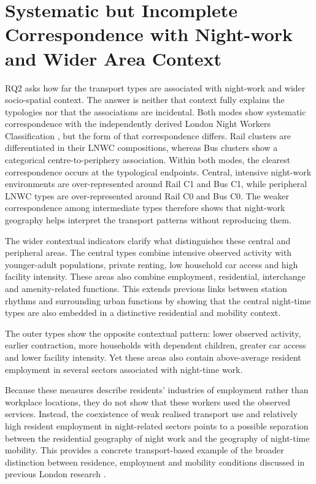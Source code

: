 \section{Systematic but Incomplete Correspondence with Night-work and Wider Area Context}

RQ2 asks how far the transport types are associated with night-work and wider socio-spatial context. The answer is neither that context fully explains the typologies nor that the associations are incidental. Both modes show systematic correspondence with the independently derived London Night Workers Classification \citep{Mavrogeni2025}, but the form of that correspondence differs. Rail clusters are differentiated in their LNWC compositions, whereas Bus clusters show a categorical centre-to-periphery association. Within both modes, the clearest correspondence occurs at the typological endpoints. Central, intensive night-work environments are over-represented around Rail C1 and Bus C1, while peripheral LNWC types are over-represented around Rail C0 and Bus C0. The weaker correspondence among intermediate types therefore shows that night-work geography helps interpret the transport patterns without reproducing them.

The wider contextual indicators clarify what distinguishes these central and peripheral areas. The central types combine intensive observed activity with younger-adult populations, private renting, low household car access and high facility intensity. These areas also combine employment, residential, interchange and amenity-related functions. This extends previous links between station rhythms and surrounding urban functions \citep{Gan2020} by showing that the central night-time types are also embedded in a distinctive residential and mobility context.

The outer types show the opposite contextual pattern: lower observed activity, earlier contraction, more households with dependent children, greater car access and lower facility intensity. Yet these areas also contain above-average resident employment in several sectors associated with night-time work.

Because these measures describe residents' industries of employment rather than workplace locations, they do not show that these workers used the observed services. Instead, the coexistence of weak realised transport use and relatively high resident employment in night-related sectors points to a possible separation between the residential geography of night work and the geography of night-time mobility. This provides a concrete transport-based example of the broader distinction between residence, employment and mobility conditions discussed in previous London research \citep{McArthur2019,Smeds2020}.

